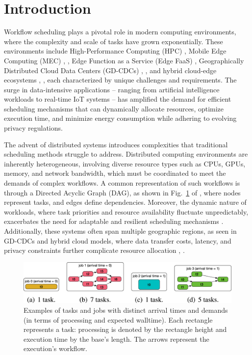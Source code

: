 \documentclass[a4paper, final]{article}
\begin{document}
\section{Introduction}
Workflow scheduling plays a pivotal role in modern computing environments, where the complexity and scale of tasks have 
grown exponentially. These environments include High-Performance Computing (HPC) \cite{bib:1_acrl}, Mobile Edge 
Computing (MEC) \cite{bib:2_faro}, \cite{bib:6_marine}, Edge Function as a Service (Edge FaaS) \cite{bib:4_faas}, 
Geographically Distributed Cloud Data Centers (GD-CDCs) \cite{bib:5_epee}, \cite{bib:7_ppps}, and hybrid cloud-edge 
ecosystems \cite{bib:8}, \cite{bib:9}, each characterized by unique challenges and requirements. The surge in data-intensive 
applications -- ranging from artificial intelligence workloads to real-time IoT systems -- has amplified the demand for 
efficient scheduling mechanisms that can dynamically allocate resources, optimize execution time, and minimize energy 
consumption while adhering to evolving privacy regulations.

The advent of distributed systems introduces complexities that traditional scheduling methods struggle to address. 
Distributed computing environments are inherently heterogeneous, involving diverse resource types such as CPUs, GPUs, 
memory, and network bandwidth, which must be coordinated to meet the demands of complex workflows. A 
common representation of such workflows is through a Directed Acyclic Graph (DAG), as shown in Fig.~\ref{fig:1} of  \cite{bib:1_acrl}, 
where nodes represent tasks, and edges define dependencies. Moreover, the dynamic nature of workloads, where task 
priorities and resource availability fluctuate unpredictably, exacerbates the need 
for adaptable and resilient scheduling mechanisms \cite{bib:3_sandcat}. Additionally, these systems often span 
multiple geographic regions, as seen in GD-CDCs and hybrid cloud models, where data transfer costs, latency, and 
privacy constraints further complicate resource allocation \cite{bib:7_ppps}, \cite{bib:9}.

\begin{figure}[H]
   \centering
   \includegraphics[scale=1.5]{dag.jpg}
   \caption{Examples of tasks and jobs with distinct arrival times and demands (in terms of processing and expected 
   walltime). Each rectangle represents a task: processing is denoted by the rectangle height and execution time by 
   the base’s length. The arrows represent the execution’s workflow.}
   \label{fig:1}
\end{figure}
\end{document}
